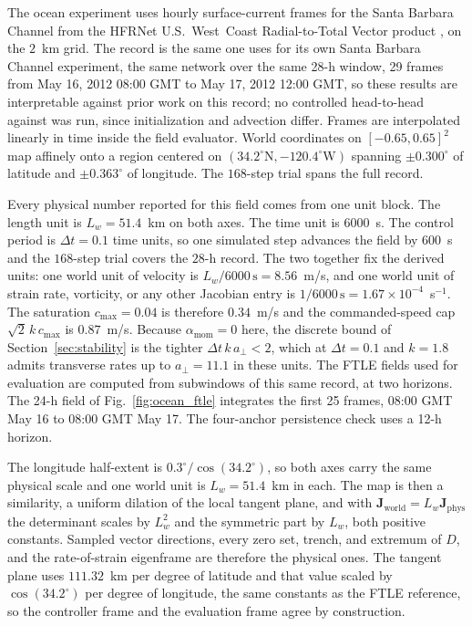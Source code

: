 \documentclass[lettersize,journal]{IEEEtran}
\begin{document}
The ocean experiment uses hourly surface-current frames for the Santa
Barbara Channel from the HFRNet U.S.~West~Coast Radial-to-Total Vector
product \cite{40}, on the $2$~km grid. The record is the same one
\cite{17} uses for its own Santa Barbara Channel experiment, the same
network over the same 28-h window, 29 frames from May 16, 2012 08:00
GMT to May 17, 2012 12:00 GMT, so these results are interpretable
against prior work on this record; no controlled head-to-head against
\cite{17} was run, since initialization and advection differ. Frames are interpolated linearly in time
inside the field evaluator. World coordinates on $[-0.65, 0.65]^2$ map
affinely onto a region centered on
$(34.2^{\circ}\mathrm{N}, -120.4^{\circ}\mathrm{W})$ spanning
$\pm 0.300^{\circ}$ of latitude and $\pm 0.363^{\circ}$ of longitude. The
$168$-step trial spans the full record.

Every physical number reported for this field comes from one unit block.
The length unit is $L_w = 51.4$~km on both axes. The time unit is
$6000$~s. The control period is $\Delta t = 0.1$ time units, so one
simulated step advances the field by $600$~s and the $168$-step trial
covers the $28$-h record. The two together fix the derived units: one
world unit of velocity is $L_w/6000\,\mathrm{s} = 8.56$~m/s, and one
world unit of strain rate, vorticity, or any other Jacobian entry is
$1/6000\,\mathrm{s} = 1.67 \times 10^{-4}$~s$^{-1}$. The saturation
$c_{\max} = 0.04$ is therefore $0.34$~m/s and the commanded-speed cap
$\sqrt{2}\,k\,c_{\max}$ is $0.87$~m/s. Because
$\alpha_{\text{mom}} = 0$ here, the discrete bound of
Section~\ref{sec:stability} is the tighter $\Delta t\,k\,a_\perp < 2$,
which at $\Delta t = 0.1$ and $k = 1.8$ admits transverse rates up to
$a_\perp = 11.1$ in these units. The FTLE fields used for evaluation are computed from
subwindows of this same record, at two horizons. The 24-h field of
Fig.~\ref{fig:ocean_ftle} integrates the first 25 frames, 08:00 GMT
May 16 to 08:00 GMT May 17. The four-anchor persistence check
uses a 12-h horizon.

The longitude half-extent is $0.3^{\circ}/\cos(34.2^{\circ})$, so both
axes carry the same physical scale and one world unit is $L_w = 51.4$~km in
each. The map is then a similarity, a uniform dilation of the local
tangent plane, and with $\mathbf{J}_{\mathrm{world}} = L_w
\mathbf{J}_{\mathrm{phys}}$ the determinant scales by $L_w^2$ and the
symmetric part by $L_w$, both positive constants. Sampled vector
directions, every zero set, trench, and extremum of $D$, and the
rate-of-strain eigenframe are therefore the physical ones. The tangent plane uses $111.32$~km per degree of
latitude and that value scaled by $\cos(34.2^{\circ})$ per degree of
longitude, the same constants as the FTLE reference, so the controller
frame and the evaluation frame agree by construction.
\end{document}
